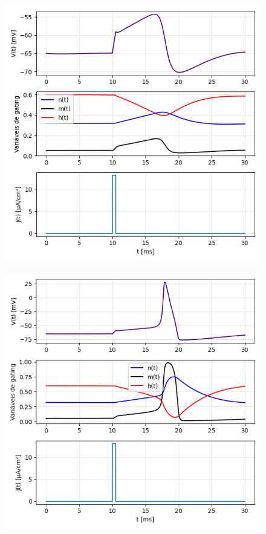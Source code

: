 \documentclass[english,11pt,a4paper]{article}
\begin{document}
	\begin{figure}[H]
		\centering
		\begin{minipage}{0.49\textwidth}
			\centering
			\includegraphics[width=\linewidth]{../figures/ex_2_1.png}
			\captionsetup{justification=centering, labelformat=empty}
			\label{fig:fig21}
		\end{minipage}
		\hfill
		\begin{minipage}{0.49\textwidth}
			\centering
			\includegraphics[width=\linewidth]{../figures/ex_2_2.png}

\end{minipage}
\end{figure}
\end{document}
